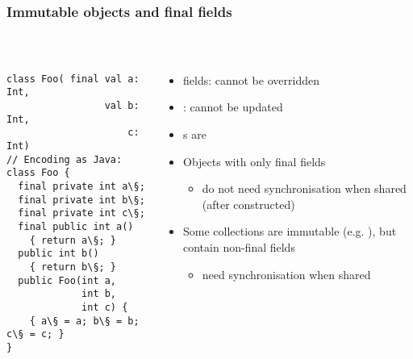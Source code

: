 \documentclass[aspectratio=169]{beamer}
\begin{document}
\begin{frame}[fragile]\frametitle{Immutable objects and final fields}
~\\[-8mm]
\begin{columns}
\begin{column}{0.42\textwidth}
\begin{lstlisting}[emph={Foo,log,thread,join,synchronized,wait,notify},morekeywords={public}]
class Foo( final val a: Int,
                 val b: Int,
                     c: Int)
// Encoding as Java:
class Foo {
  final private int a\§;
  final private int b\§;
  final private int c\§;
  final public int a()
    { return a\§; }
  public int b()
    { return b\§; }
  public Foo(int a,
             int b,
             int c) {
    { a\§ = a; b\§ = b; c\§ = c; }
}
\end{lstlisting}
\end{column}
\begin{column}{0.56\textwidth}
\begin{itemize}
  \item {} fields: cannot be \alert{overridden}
  \item {}: cannot be \alert{updated}
  \item {}s are 
  \item Objects with only final fields
    \begin{itemize}
      \item \alert{do not need synchronisation} when shared (after constructed)
    \end{itemize}
  \item Some collections are immutable (e.g. ), but contain non-final fields
    \begin{itemize}
      \item \alert{need synchronisation} when shared
    \end{itemize}
\end{itemize}
\end{column}
\end{columns}
\end{frame}
\end{document}
